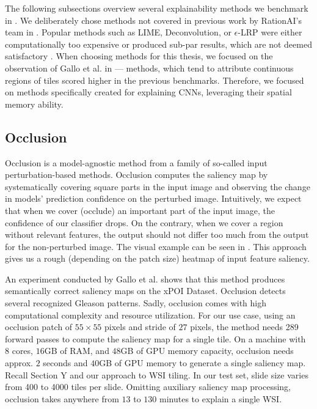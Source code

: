 The following subsections overview several explainability methods we benchmark in .
We deliberately chose methods not covered in previous work by RationAI's team in \cite{gallo, krajnansky-grad-cam}.
Popular methods such as LIME, Deconvolution, or $\epsilon$-LRP  were either computationally too expensive or produced sub-par results, which are not deemed satisfactory \cite{gallo}.
When choosing methods for this thesis, we focused on the observation of Gallo et al. in \cite{gallo} --- methods, which tend to attribute continuous regions of tiles scored higher in the previous benchmarks.
Therefore, we focused on methods specifically created for explaining CNNs, leveraging their spatial memory ability.

\subsection{Occlusion}\label{occlusion}

Occlusion is a model-agnostic method from a family of so-called input perturbation-based methods.
Occlusion computes the saliency map by systematically covering square parts in the input image and observing the change in models' prediction confidence on the perturbed image.
Intuitively, we expect that when we cover (occlude) an important part of the input image, the confidence of our classifier drops.
On the contrary, when we cover a region without relevant features, the output should not differ too much from the output for the non-perturbed image.
The visual example can be seen in . This approach gives us a rough (depending on the patch size) heatmap of input feature saliency.

An experiment conducted by Gallo et al. \cite{gallo} shows that this method produces semantically correct saliency maps on the xPOI Dataset.
Occlusion detects several recognized Gleason patterns.
Sadly, occlusion comes with high computational complexity and resource utilization.
For our use case, using an occlusion patch of $55 \times 55$ pixels and stride of $27$ pixels, the method needs 289 forward passes to compute the saliency map for a single tile.
On a machine with $8$ cores, $16$GB of RAM, and $48$GB of GPU memory capacity, occlusion needs approx. $2$ seconds and $40$GB of GPU memory to generate a single saliency map.
Recall Section Y and our approach to WSI tiling.
In our test set, slide size varies from 400 to 4000 tiles per slide.
Omitting auxiliary saliency map processing, occlusion takes anywhere from $13$ to $130$ minutes to explain a single WSI.

